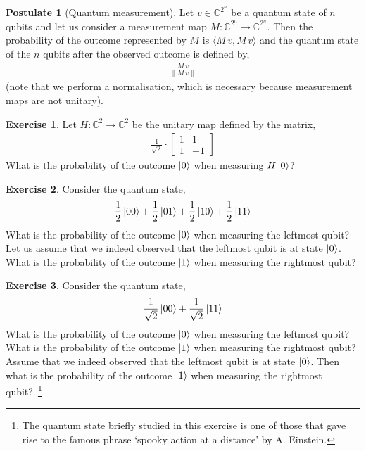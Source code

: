 \documentclass[a4paper, 11pt]{article}
\newcommand{\complex}{\mathbb{C}}
\theoremstyle{definition}
\newtheorem{exercise}{Exercise}
\newtheorem{postulate}{Postulate}
\begin{document}
\begin{postulate}[Quantum measurement]
  Let $v \in \complex^{2^n}$ be a quantum state of $n$ qubits and let
  us consider a measurement map
  $M : \complex^{2^n} \to \complex^{2^n}$. Then the probability of the
  outcome represented by $M$ is $\langle M \, v, M \, v \rangle$ and the
  quantum state of the $n$ qubits after the observed outcome is
  defined by,
  \begin{align*}
    \frac{M \, v}{\| M \, v \|}
  \end{align*}
  (note that we perform a normalisation, which is necessary because
  measurement maps are not unitary).
\end{postulate}

\begin{exercise}
  Let $H : \complex^2 \to \complex^2$ be the unitary map defined by
  the matrix,
  \begin{align*} \frac{1}{\sqrt{2}} \cdot
     \begin{bmatrix}
       1 & 1 \\
       1 & -1
  \end{bmatrix}
  \end{align*}
  What is the probability of the outcome $\ket{0}$ when measuring
  $H \ket{0}$?
\end{exercise}

\begin{exercise}
  Consider the quantum state,
  \begin{align*}
    \frac{1}{2} \ket{00} + \frac{1}{2} \ket{01} + \frac{1}{2} \ket{10} +
    \frac{1}{2} \ket{11}
  \end{align*}
  What is the probability of the outcome $\ket{0}$ when measuring the
  leftmost qubit? Let us assume that we indeed observed that the
  leftmost qubit is at state $\ket{0}$. What is the probability of
  the outcome $\ket{1}$ when measuring the rightmost qubit?
\end{exercise}

\begin{exercise}
  Consider the quantum state,
  \begin{align*}
    \frac{1}{\sqrt{2}} \ket{00} + \frac{1}{\sqrt{2}} \ket{11}
  \end{align*}
  What is the probability of the outcome $\ket{0}$ when measuring the
  leftmost qubit? What is the probability of the outcome $\ket{1}$
  when measuring the rightmost qubit? Assume that we indeed observed
  that the leftmost qubit is at state $\ket{0}$. Then what is the
  probability of the outcome $\ket{1}$ when measuring the rightmost
  qubit?~\footnote{The quantum state briefly studied in this exercise
    is one of those that gave rise to the famous phrase 
    `spooky action at a distance' by A. Einstein.}
\end{exercise}
\end{document}
